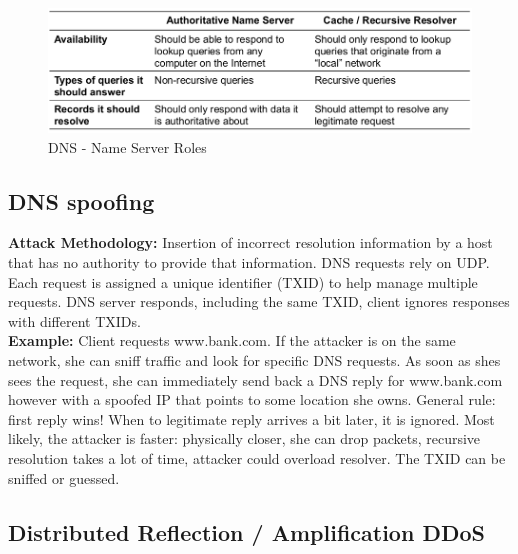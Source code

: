 \documentclass[11pt,oneside,a4paper]{article}
\begin{document}
\begin{figure}[hb]
	\centering
	\includegraphics[width=0.7\linewidth]{figures/dns_name_server_roles}
	\caption{DNS - Name Server Roles}
	\label{fig:dnsnameserverroles}
\end{figure}

\subsection{DNS spoofing}

\textbf{Attack Methodology:} Insertion of incorrect resolution information by a host that has no authority to provide that information. DNS requests rely on UDP. Each request is assigned a unique identifier (TXID) to help manage multiple requests. DNS server responds, including the same TXID, client ignores responses with different TXIDs.\\
\textbf{Example:} Client requests www.bank.com. If the attacker is on the same network, she can sniff traffic and look for specific DNS requests. As soon as shes sees the request, she can immediately send back a DNS reply for www.bank.com however with a spoofed IP that points to some location she owns. General rule: first reply wins! When to legitimate reply arrives a bit later, it is ignored. Most likely, the attacker is faster: physically closer, she can drop packets, recursive resolution takes a lot of time, attacker could overload resolver. The TXID can be sniffed or guessed.

\subsection{Distributed Reflection / Amplification DDoS}
\label{dns_ddos}
\end{document}

